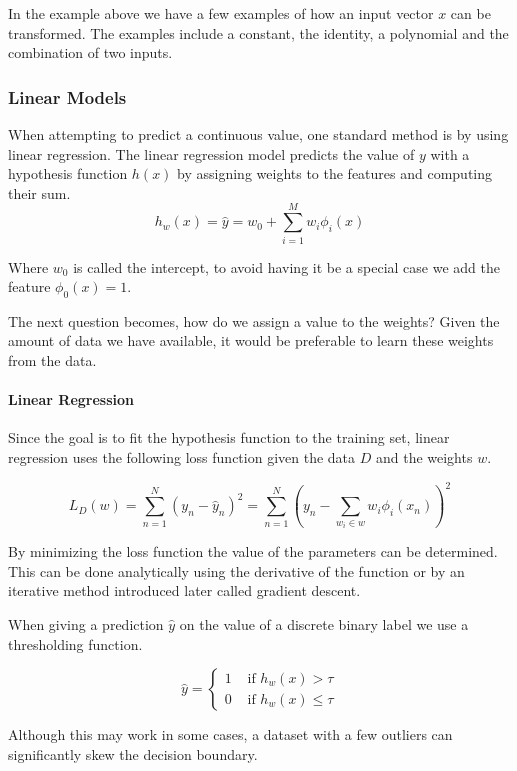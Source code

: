 In the example above we have a few examples of how an input vector $x$ can be transformed.
The examples include a constant, the identity, a polynomial and the combination of two inputs.

\subsubsection{Linear Models}

When attempting to predict a continuous value, one standard method is by using linear regression.
The linear regression model predicts the value of $y$ with a hypothesis function $h(x)$ by assigning weights to the features and computing their sum.
$$h_w(x) = \hat{y} = w_0 + \sum_{i=1}^M w_i \phi_i(x)$$ 

Where $w_0$ is called the intercept, to avoid having it be a special case we add the feature $\phi_0(x)=1$.

The next question becomes, how do we assign a value to the weights?
Given the amount of data we have available, it would be preferable to learn these weights from the data. 

\paragraph{Linear Regression}
Since the goal is to fit the hypothesis function to the training set, linear regression uses the following loss function given the data $D$ and the weights $w$.

$$ L_D(w) = \sum_{n=1}^N (y_n-\hat{y}_n)^2 = \sum_{n=1}^N (y_n - \sum_{w_i \in w} w_i \phi_i(x_n))^2 $$ 
    
By minimizing the loss function the value of the parameters can be determined.
This can be done analytically using the derivative of the function or by an iterative method introduced later called gradient descent.

When giving a prediction $\hat{y}$ on the value of a discrete binary label we use a thresholding function.

$$\hat{y} = \begin{cases}
	1 &\text{ if } h_w(x) > \tau \\
	0 &\text{ if } h_w(x) \leq \tau  %
\end{cases}$$ 

Although this may work in some cases, a dataset with a few outliers can significantly skew the decision boundary.

